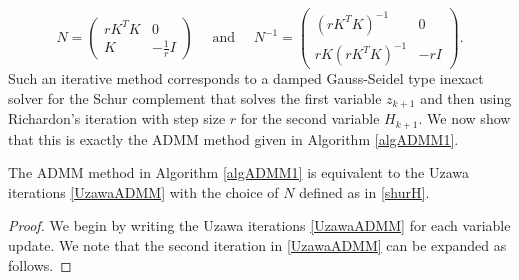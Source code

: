 \begin{itemize}
\begin{equation}
N = \begin{pmatrix}
r K^T K & 0\\
K & - \frac{1}{r} I
\end{pmatrix} \quad \mbox{ and } \quad  N^{-1} = \begin{pmatrix}
(r K^T K)^{-1} &  0 \\
 r K (r K^T K)^{-1} & - r I
\end{pmatrix}. 
\end{equation}
Such an iterative method corresponds to a damped Gauss-Seidel type inexact solver for the Schur complement that solves the first variable $z_{k+1}$ and then using Richardon's iteration with step size $r$ for the second variable $H_{k+1}$. We now show that this is exactly the ADMM method given in Algorithm \ref{algADMM1}.

\begin{proposition}\label{prop: Uzawa iterative solver}
The ADMM method in Algorithm \ref{algADMM1} is equivalent to the Uzawa iterations \eqref{UzawaADMM} with the choice of $N$ defined as in \eqref{shurH}.
\end{proposition}
\begin{proof}
We begin by writing the Uzawa iterations \eqref{UzawaADMM} for each variable update. We note that the second iteration in \eqref{UzawaADMM}  can be expanded as follows.


\end{proof}
\end{itemize}

